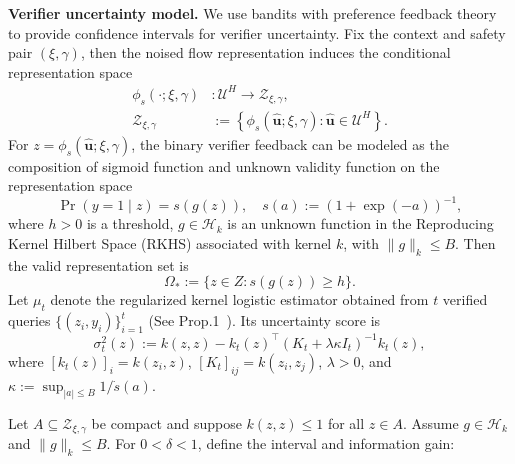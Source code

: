 \begin{itemize}[leftmargin=0pt, itemindent=0pt, label={}]
\noindent\textbf{Verifier uncertainty model.}
We use bandits with preference feedback theory to provide confidence intervals for verifier uncertainty. Fix the context and safety pair \((\xi,\gamma)\), then the noised flow representation induces the conditional representation space
\begin{equation}
    \begin{aligned}
        \phi_s(\cdot;\xi,\gamma)&:\mathcal U^H\rightarrow
        \mathcal Z_{\xi,\gamma},\\
        \mathcal Z_{\xi,\gamma}
        &:=
        \left\{
        \phi_s(\hat{\mathbf u};\xi,\gamma):
        \hat{\mathbf u}\in\mathcal U^H
        \right\}.
    \end{aligned}
    \label{eq:conditional-representation-space}
\end{equation}
For \(z=\phi_s(\hat{\mathbf u};\xi,\gamma)\), the binary verifier feedback can be modeled as the composition of sigmoid function and unknown validity function on the representation space
\begin{equation}
    \Pr(y=1\mid z)=s(g(z)), \quad
    s(a):=(1+\exp(-a))^{-1},
    \label{eq:logistic-verifier-model}
\end{equation}
where $h>0$ is a threshold, \(g\in\mathcal H_k\) is an unknown function in the Reproducing Kernel Hilbert Space (RKHS) associated
with kernel \(k\), with \(\|g\|_k\le B\). Then the valid representation set is
\begin{equation}
\Omega_* := \{z\in Z : s(g(z)) \ge h\}.
\label{eq:prob_valid_set}
\end{equation}
Let \(\mu_t\) denote the
regularized kernel logistic estimator obtained from \(t\) verified
queries \(\{(z_i,y_i)\}_{i=1}^t\) (See Prop.1~\cite{pasztor2024bandits}). Its uncertainty score is
\begin{equation}
    \sigma_t^2(z)
    :=
    k(z,z)
    -
    k_t(z)^\top
    \left(K_t+\lambda\kappa I_t\right)^{-1}
    k_t(z),
    \label{eq:kernel-logistic-uncertainty}
\end{equation}
where \([k_t(z)]_i=k(z_i,z)\), \([K_t]_{ij}=k(z_i,z_j)\),
\(\lambda>0\), and
\(\kappa:=\sup_{|a|\le B}1/\dot{s}(a)\).
\begin{lemma}
\label{thm:kernelized-logistic-confidence}
Let
\(A\subseteq\mathcal Z_{\xi,\gamma}\) be compact and suppose
\(k(z,z)\le1\) for all \(z\in A\). Assume
\(g\in\mathcal H_k\) and \(\|g\|_k\le B\). For \(0<\delta<1\), define the interval and information gain:
\begin{align}

\end{align}
\end{lemma}
\end{itemize}
